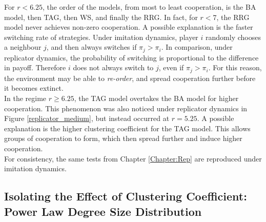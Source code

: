 For $r<6.25$, the order of the models, from most to least cooperation, is the BA model, then TAG, then WS, and finally the RRG. In fact, for $r<7$, the RRG model never achieves non-zero cooperation. A possible explanation is the faster switching rate of strategies. Under imitation dynamics, player $i$ randomly chooses a neighbour $j$, and then always switches if $\pi_j>\pi_i$. In comparison, under replicator dynamics, the probability of switching is proportional to the difference in payoff. Therefore $i$ does not always switch to $j$, even if $\pi_j>\pi_i$. For this reason, the environment may be able to \emph{re-order}, and spread cooperation further before it becomes extinct. \\

In the regime $r\geq 6.25$, the TAG model overtakes the BA model for higher cooperation. This phenomenon was also noticed under replicator dynamics in Figure \ref{replicator_medium}, but instead occurred at $r=5.25$. A possible explanation is the higher clustering coefficient for the TAG model. This allows groups of cooperation to form, which then spread further and induce higher cooperation. \\

For consistency, the same tests from Chapter \ref{Chapter:Rep} are reproduced under imitation dynamics. \\

\subsection{Isolating the Effect of Clustering Coefficient: Power Law Degree Size Distribution}

\FloatBarrier
{}
\FloatBarrier
{} \FloatBarrier

